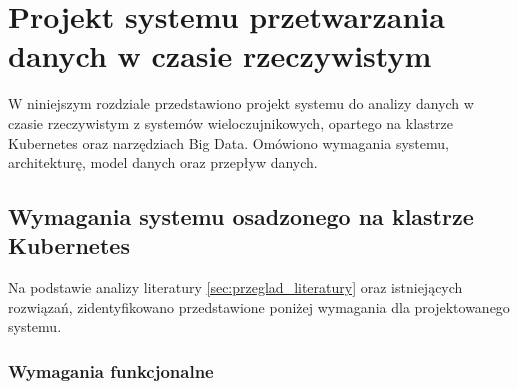 \section{Projekt systemu przetwarzania danych w czasie rzeczywistym}
\label{sec:projekt_systemu}

W niniejszym rozdziale przedstawiono projekt systemu do analizy danych w czasie rzeczywistym z systemów wieloczujnikowych, opartego na klastrze Kubernetes oraz narzędziach Big Data. Omówiono wymagania systemu, architekturę, model danych oraz przepływ danych.

\subsection{Wymagania systemu osadzonego na klastrze Kubernetes}
\label{subsec:wymagania}

Na podstawie analizy literatury \ref{sec:przeglad_literatury} oraz istniejących rozwiązań, zidentyfikowano przedstawione poniżej wymagania dla projektowanego systemu.

\subsubsection{Wymagania funkcjonalne}
\label{subsubsec:wymagania_funkcjonalne}

